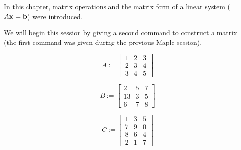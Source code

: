 In this chapter, matrix operations and the matrix form of a linear
system ( $A{\bf x}={\bf b}$) were introduced.

We will begin this session by giving a second command to construct
a matrix (the first command was given during the previous Maple
session).

\bigskip

\begin{maplegroup}
\begin{mapleinput}
\end{mapleinput}

\mapleresult
\begin{maplelatex}
\[
A :=  \left[ {\begin{array}{rrr} 1 & 2 & 3 \\ 2 & 3 & 4 \\ 3 & 4 &
5
\end{array}}
 \right]
\]
\end{maplelatex}

\end{maplegroup}
\begin{maplegroup}
\begin{mapleinput}
\end{mapleinput}

\mapleresult
\begin{maplelatex}
\[
B :=  \left[ {\begin{array}{rrr} 2 & 5 & 7 \\ 13 & 3 & 5 \\ 6 & 7
& 8
\end{array}}
 \right]
\]
\end{maplelatex}

\end{maplegroup}
\begin{maplegroup}
\begin{mapleinput}
\end{mapleinput}

\mapleresult
\begin{maplelatex}
\[
C :=  \left[ {\begin{array}{rrr} 1 & 3 & 5 \\ 7 & 9 & 0 \\ 8 & 6 &
4 \\ 2 & 1 & 7
\end{array}}
 \right]
\]
\end{maplelatex}

\end{maplegroup}
